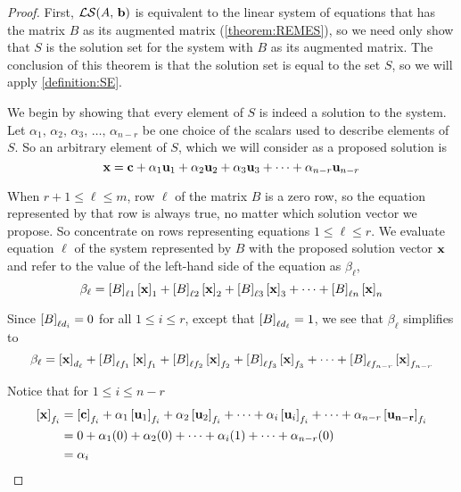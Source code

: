 \documentclass{ximera}
\begin{document}
\begin{theorem}
  \begin{proof}
    First, $\mathcal{LS}\!\left(A,\,\mathbf{b}\right)$ is equivalent to the linear
    system of equations that has the matrix $B$ as its augmented
    matrix (\ref{theorem:REMES}), so we need only show that $S$ is the
    solution set for the system with $B$ as its augmented matrix.  The
    conclusion of this theorem is that the solution set is equal to
    the set $S$, so we will apply \ref{definition:SE}.

    We begin by showing that every element of $S$ is indeed a solution
    to the system.  Let
    $\alpha_1,\,\alpha_2,\,\alpha_3,\,\ldots,\,\alpha_{n-r}$ be one
    choice of the scalars used to describe elements of $S$.  So an
    arbitrary element of $S$, which we will consider as a proposed
    solution is
    \[
      \mathbf{x}=
      \mathbf{c}+\alpha_1\mathbf{u}_1+\alpha_2\mathbf{u}_2+\alpha_3\mathbf{u}_3+\cdots+\alpha_{n-r}\mathbf{u}_{n-r}
    \]
    
    When $r+1\leq\ell\leq m$, row $\ell$ of the matrix $B$ is a zero
    row, so the equation represented by that row is always true, no
    matter which solution vector we propose.  So concentrate on rows
    representing equations $1\leq\ell\leq r$.  We evaluate equation
    $\ell$ of the system represented by $B$ with the proposed solution
    vector $\mathbf{x}$ and refer to the value of the left-hand side of
    the equation as $\beta_\ell$,
    \[
      \beta_\ell=
      \left\lbrack B\right\rbrack_{\ell 1}\left\lbrack\mathbf{x}\right\rbrack_{1}+
      \left\lbrack B\right\rbrack_{\ell 2}\left\lbrack\mathbf{x}\right\rbrack_{2}+
      \left\lbrack B\right\rbrack_{\ell 3}\left\lbrack\mathbf{x}\right\rbrack_{3}+
      \cdots+
      \left\lbrack B\right\rbrack_{\ell n}\left\lbrack\mathbf{x}\right\rbrack_{n}
    \]
    
    Since $\left\lbrack B\right\rbrack_{\ell d_{i}}=0$ for all $1\leq i\leq r$,
    except that $\left\lbrack B\right\rbrack_{\ell d_{\ell}}=1$, we see that
    $\beta_\ell$ simplifies to
    \[
      \beta_\ell=
      \left\lbrack\mathbf{x}\right\rbrack_{d_{\ell}}+
      \left\lbrack B\right\rbrack_{\ell f_1}\left\lbrack\mathbf{x}\right\rbrack_{f_1}+
      \left\lbrack B\right\rbrack_{\ell f_2}\left\lbrack\mathbf{x}\right\rbrack_{f_2}+
      \left\lbrack B\right\rbrack_{\ell f_3}\left\lbrack\mathbf{x}\right\rbrack_{f_3}+
      \cdots+
      \left\lbrack B\right\rbrack_{\ell f_{n-r}}\left\lbrack\mathbf{x}\right\rbrack_{f_{n-r}}
    \]

    Notice that for $1\leq i\leq n-r$
    \begin{align*}
      \left\lbrack\mathbf{x}\right\rbrack_{f_i}
      &=
        \left\lbrack\mathbf{c}\right\rbrack_{f_i}+
        \alpha_1\left\lbrack\mathbf{u}_1\right\rbrack_{f_i}+
        \alpha_2\left\lbrack\mathbf{u}_2\right\rbrack_{f_i}+
        \cdots+
        \alpha_i\left\lbrack\mathbf{u}_i\right\rbrack_{f_i}+
        \cdots+
        \alpha_{n-r}\left\lbrack\mathbf{u_{n-r}}\right\rbrack_{f_i}\\
      &=
        0+
        \alpha_1(0)+
        \alpha_2(0)+
        \cdots+
        \alpha_i(1)+
        \cdots+
        \alpha_{n-r}(0)\\
      &=
        \alpha_i
    \end{align*}


\end{proof}
\end{theorem}
\end{document}
